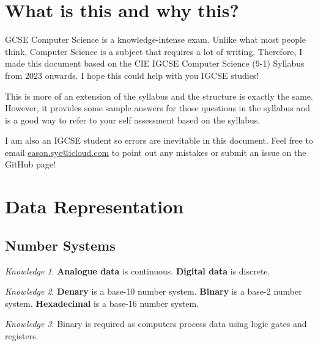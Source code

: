 \documentclass[8pt]{article}
\author{\Author}
\title{\Title}
\date{Version 1. \Date}
\theoremstyle{remark}
\newtheorem{knowledge}{Knowledge}[subsection]
\begin{document}
	\maketitle

	\tableofcontents

    \section*{What is this and why this?}
    
        GCSE Computer Science is a knowledge-intense exam. Unlike what most people think, Computer Science is a subject that requires a lot of writing. Therefore, I made this document based on the CIE IGCSE Computer Science (9-1) Syllabus from 2023 onwards. I hope this could help with you IGCSE studies!

        This is more of an extension of the syllabus and the structure is exactly the same. However, it provides some sample answers for those questions in the syllabus and is a good way to refer to your self assessment based on the syllabus.

        I am also an IGCSE student so errors are inevitable in this document. Feel free to email \href{eason.syc@icloud.com}{eason.syc@icloud.com} to point out any mistakes or submit an issue on the GitHub page!
        
    \section{Data Representation}
        \subsection{Number Systems}

        \begin{knowledge}
            \textbf{Analogue data} is continuous. \textbf{Digital data} is discrete.
        \end{knowledge}

        \begin{knowledge}
            \textbf{Denary} is a base-10 number system. \textbf{Binary} is a base-2 number system. \textbf{Hexadecimal} is a base-16 number system.
        \end{knowledge}

        \begin{knowledge}
            Binary is required as computers process data using logic gates and registers.
        \end{knowledge}
\end{document}

